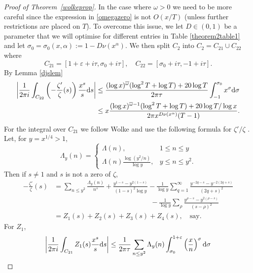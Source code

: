 \documentclass[reqno]{amsart}
\numberwithin{equation}{section}
\theoremstyle{remark}
\begin{document}
\begin{proof}[Proof of Theorem~\ref{wolkeprop}]
In the case where $\omega>0$ we need to be more careful since the expression in \eqref{omegazero} is not $O(x/T)$ (unless further restrictions are placed on $T$). To overcome this issue, we let $D\in(0,1)$ be a parameter that we will optimise for different entries in Table \ref{theorem2table1} and let $\sigma_0=\sigma_0(x,\alpha):=1-D\nu(x^{\alpha})$. We then split $C_2$ into $C_2=C_{21}\cup C_{22}$ where
\begin{equation*}
    C_{21}=[1+\varepsilon+i\tau,\sigma_0+i\tau],\quad C_{22}=[\sigma_0+i\tau,-1+i\tau].
\end{equation*}
By Lemma \ref{djslem}
\begin{align}\label{toughterm}
    \left|\frac{1}{2\pi i}\int_{C_{22}}\left(-\frac{\zeta'}{\zeta}(s)\right)\frac{x^s}{s}\mathrm{d}s\right|&\leq\frac{(\log x)^{\overline{\omega}}(\log^2T+\log T)+20\log T}{2\pi\tau}\int_{-1}^{\sigma_0}x^\sigma\mathrm{d}\sigma\notag\\
    &\leq x\frac{(\log x)^{\overline{\omega}-1}(\log^2T+\log T)+20\log T/\log x}{2\pi x^{D \nu(x^{\alpha})}(T-1)}.
\end{align}
For the integral over $C_{21}$ we follow Wolke and use the following formula for $\zeta'/\zeta$ \cite[Lemma 2]{selberg1943normal}. Let, for $y=x^{1/4}>1$,
\begin{equation*}
    \Lambda_y(n)=
    \begin{cases}
        \Lambda(n),&1\leq n\leq y\\
        \Lambda(n)\frac{\log(y^2/n)}{\log y},&y\leq n\leq y^2. 
    \end{cases}
\end{equation*}
Then if $s\neq 1$ and $s$ is not a zero of $\zeta$,
\begin{align*}
    -\frac{\zeta'}{\zeta}(s)&=\sum_{n\leq y^2}\frac{\Lambda_y(n)}{n^s}+\frac{y^{1-s}-y^{2(1-s)}}{(1-s)^2\log y}-\frac{1}{\log y}\sum_{q=1}^\infty\frac{y^{-2q-s}-y^{-2(2q+s)}}{(2q+s)^2}\\
    &\qquad\qquad\qquad\qquad\qquad\qquad\qquad-\frac{1}{\log y}\sum_{\rho}\frac{y^{\rho-s}-y^{2(\rho-s)}}{(s-\rho)^2}\\
    &=Z_1(s)+Z_2(s)+Z_3(s)+Z_4(s),\quad\text{say}.
\end{align*}
For $Z_1$,
\begin{align}\label{z1boundeq}
    \left|\frac{1}{2\pi i}\int_{C_{21}}Z_1(s)\frac{x^s}{s}\mathrm{d}s\right|&\leq\frac{1}{2\pi\tau}\sum_{n\leq y^2}\Lambda_y(n)\int_{\sigma_0}^{1+\varepsilon}\left(\frac{x}{n}\right)^\sigma\mathrm{d}\sigma\notag\\

\end{align}
\end{proof}
\end{document}
